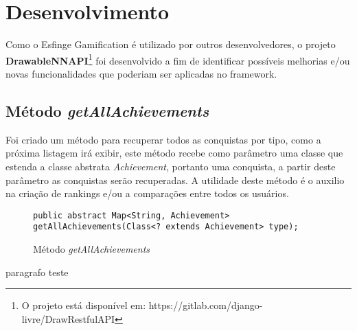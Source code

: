 \newpage
\chapter{Desenvolvimento}
\label{ch:desenvolvimento}


\par Como o Esfinge Gamification é utilizado por outros desenvolvedores, o projeto \textbf{DrawableNNAPI}\footnote{O projeto está disponível em: https://gitlab.com/django-livre/DrawRestfulAPI} foi desenvolvido a fim de identificar possíveis melhorias e/ou novas funcionalidades que poderiam ser aplicadas no framework.

\section{Método \textit{getAllAchievements}}
\par Foi criado um método para recuperar todos as conquistas por tipo, como a próxima listagem irá exibir, este método recebe como parâmetro uma classe que estenda a classe abstrata \textit{Achievement}, portanto uma conquista, a partir deste parâmetro as conquistas serão recuperadas. A utilidade deste método é o auxilio na criação de rankings e/ou a comparações entre todos os usuários.

\begin{figure}[H]
    \centering
    \begin{lstlisting}
public abstract Map<String, Achievement> getAllAchievements(Class<? extends Achievement> type);
\end{lstlisting}
    \caption{Método \textit{getAllAchievements}}
    \label{fig:metodo getAllAchievement}
\end{figure}

\par paragrafo teste